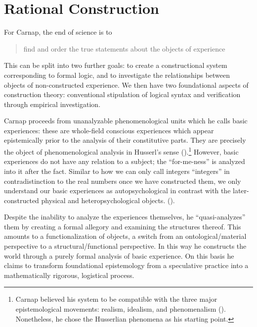\documentclass[leqno, 12pt]{turabian-researchpaper}
\begin{document}
	\section{Rational Construction}

	For Carnap, the end of science is to \blockquote[{}]{find and order the true statements about the objects of experience}.
	This can be split into two further goals: to create a constructional system corresponding
	to formal logic, and to investigate the relationships between objects of non-constructed
	experience. We then have two foundational aspects of construction theory:
	conventional stipulation of logical syntax and verification through empirical
	investigation.

	Carnap proceeds from unanalyzable phenomenological units which he calls basic
	experiences: these are whole-field conscious experiences which appear epistemically
	prior to the analysis of their constitutive parts. They are precisely the
	object of phenomenological analysis in Husserl's sense ().\footnote{Carnap
	believed his system to be compatible with the three major epistemological
	movements: realism, idealism, and phenomenalism ().
	Nonetheless, he chose the Husserlian phenomena as his starting point.} However,
	basic experiences do not have any relation to a subject; the \enquote{for-me-ness}
	is analyzed into it after the fact. Similar to how we can only call integers \enquote{integers}
	in contradistinction to the real numbers once we have constructed them, we only
	understand our basic experiences as autopsychological in contrast with the later-constructed
	physical and heteropsychological objects. ().

	Despite the inability to analyze the experiences themselves, he \enquote{quasi-analyzes}
	them by creating a formal allegory and examining the structures thereof. This amounts
	to a functionalization of objects, a switch from an ontological/material
	perspective to a structural/functional perspective. In this way he constructs the
	world through a purely formal analysis of basic experience. On this basis he
	claims to transform foundational epistemology from a speculative practice into
	a mathematically rigorous, logistical process.
\end{document}
